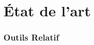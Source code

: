 \section{État de l'art}\label{sec:section-2}
\begin{frame}
    \frametitle{Outils Relatif }


\end{frame}
